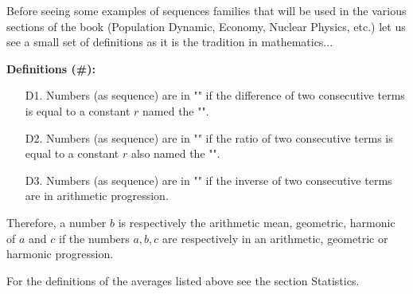 Before seeing some examples of sequences families that will be used in the various sections of the book (Population Dynamic, Economy, Nuclear Physics, etc.) let us see a small set of definitions as it is the tradition in mathematics...

\textbf{Definitions (\#\mydef):}
	\begin{enumerate}
		\item[D1.] Numbers (as sequence) are in "" if the difference of two consecutive terms is equal to a constant $r$ named the "".
		
		\item[D2.] Numbers (as sequence) are in "" if the ratio of two consecutive terms is equal to a constant $r$ also named the "".
		
		\item[D3.] Numbers (as sequence) are in "" if the inverse of two consecutive terms are in arithmetic progression.
	\end{enumerate}

	Therefore, a number $b$ is respectively the arithmetic mean, geometric, harmonic of $a$ and $c$ if the numbers $a, b, c$ are respectively in  an arithmetic, geometric or harmonic progression.

	\begin{tcolorbox}[title=Remark,colframe=black,arc=10pt]
For the definitions of the averages listed above see the section Statistics.
	\end{tcolorbox}
	
